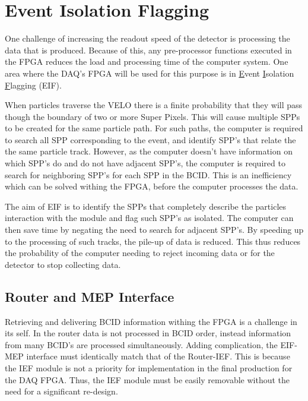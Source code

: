 \section{Event Isolation Flagging}
	
	One challenge of increasing the readout speed of the detector is processing the data that is produced.
	Because of this, any pre-processor functions executed in the FPGA reduces the load and processing time of the computer system.
	One area where the DAQ's FPGA will be used for this purpose is in \underline{E}vent \underline{I}solation \underline{F}lagging (EIF).
	\par
	When particles traverse the VELO there is a finite probability that they will pass though the boundary of two or more Super Pixels.
	This will cause multiple SPPs to be created for the same particle path.
	For such paths, the computer is required to search all SPP corresponding to the event, and identify SPP's that relate the the same particle track. However, as the computer doesn't have information on which SPP's do and do not have adjacent SPP's, the computer is required to search for neighboring SPP's for each SPP in the BCID. This is an inefficiency which can be solved withing the FPGA, before the computer processes the data.
	\par
	The aim of EIF is to identify the SPPs that completely describe the particles interaction with the module and flag such SPP's as isolated.
	The computer can then save time by negating the need to search for adjacent SPP's.
	By speeding up to the processing of such tracks, the pile-up of data is reduced.
	This thus reduces the probability of the computer needing to reject incoming data or for the detector to stop collecting data.

	\subsection{Router and MEP Interface} %
	\label{sub:router_and_mep_interface}

		Retrieving and delivering BCID information withing the FPGA is a challenge in its self.
		In the router data is not processed in BCID order, instead information from many BCID's are processed simultaneously.
		Adding complication, the EIF-MEP interface must identically match that of the Router-IEF.
		This is because the IEF module is not a priority for implementation in the final production for the DAQ FPGA.
		Thus, the IEF module must be easily removable without the need for a significant re-design.

